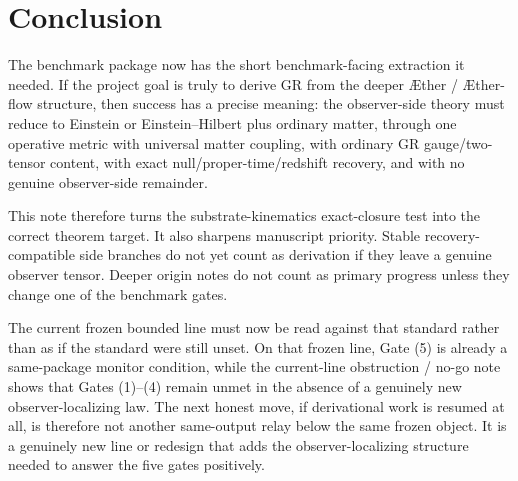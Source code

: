 \documentclass[11pt]{article}
\newcommand{\Aether}{\AE{}ther}
\newcommand{\Aflow}{\AE{}ther-flow}
\begin{document}
\section{Conclusion}

The benchmark package now has the short benchmark-facing extraction it needed. If the project goal is truly to derive GR from the deeper \Aether{} / \Aflow{} structure, then success has a precise meaning: the observer-side theory must reduce to Einstein or Einstein--Hilbert plus ordinary matter, through one operative metric with universal matter coupling, with ordinary GR gauge/two-tensor content, with exact null/proper-time/redshift recovery, and with no genuine observer-side remainder.

This note therefore turns the substrate-kinematics exact-closure test into the correct theorem target. It also sharpens manuscript priority. Stable recovery-compatible side branches do not yet count as derivation if they leave a genuine observer tensor. Deeper origin notes do not count as primary progress unless they change one of the benchmark gates.

The current frozen bounded line must now be read against that standard rather than as if the standard were still unset. On that frozen line, Gate (5) is already a same-package monitor condition, while the current-line obstruction / no-go note shows that Gates (1)--(4) remain unmet in the absence of a genuinely new observer-localizing law. The next honest move, if derivational work is resumed at all, is therefore not another same-output relay below the same frozen object. It is a genuinely new line or redesign that adds the observer-localizing structure needed to answer the five gates positively.
\end{document}
